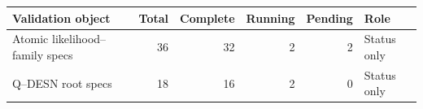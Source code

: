 \begin{tabular}{@{}lrrrrl@{}}
\toprule
Validation object & Total & Complete & Running & Pending & Role \\
\midrule
Atomic likelihood--family specs & 36 & 32 & 2 & 2 & Status only \\
Q--DESN root specs & 18 & 16 & 2 & 0 & Status only \\
\bottomrule
\end{tabular}
